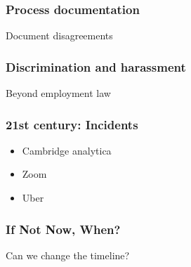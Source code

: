 \begin{frame}[fragile]
\frametitle{Process documentation}

Document disagreements

\end{frame}

\begin{frame}[fragile]
\frametitle{Discrimination and harassment}

Beyond employment law

\end{frame}

\begin{frame}[fragile]
\frametitle{21st century: Incidents}

\begin{itemize}
\item Cambridge analytica
\item Zoom
\item Uber
\end{itemize}

\end{frame}

\begin{frame}[fragile]
\frametitle{If Not Now, When?}

Can we change the timeline?

\end{frame}


